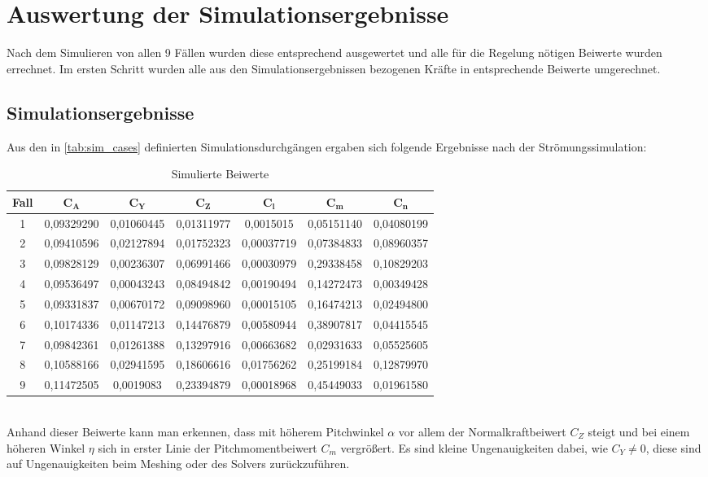 \section{Auswertung der Simulationsergebnisse}
\label{sec:simulation_results}
Nach dem Simulieren von allen 9 Fällen wurden diese entsprechend ausgewertet und alle für die Regelung nötigen Beiwerte wurden errechnet. Im ersten Schritt wurden alle aus den Simulationsergebnissen bezogenen Kräfte in entsprechende Beiwerte umgerechnet.
\newpage
\subsection{Simulationsergebnisse} 
\label{subsec:sim_results}
Aus den in \ref{tab:sim_cases} definierten Simulationsdurchgängen ergaben sich folgende Ergebnisse nach der Strömungssimulation:
\begin{table}[h]
\centering
\begin{tabular}{|c|c|c|c|c|c|c|}
\hline
\textbf{Fall} & $\mathbf{C_A}$ & $\mathbf{C_Y}$ & $\mathbf{C_Z}$ & $\mathbf{C_l}$ & $\mathbf{C_m}$ & $\mathbf{C_n}$ \\
\hline
1 & 0,09329290 & 0,01060445 & 0,01311977 & 0,0015015 & 0,05151140 & 0,04080199 \\
2 & 0,09410596 & 0,02127894 & 0,01752323 & 0,00037719 & 0,07384833 & 0,08960357 \\
3 & 0,09828129 & 0,00236307 & 0,06991466 & 0,00030979 & 0,29338458 & 0,10829203 \\
4 & 0,09536497 & 0,00043243 & 0,08494842 & 0,00190494 & 0,14272473 & 0,00349428 \\
5 & 0,09331837 & 0,00670172 & 0,09098960 & 0,00015105 & 0,16474213 & 0,02494800 \\
6 & 0,10174336 & 0,01147213 & 0,14476879 & 0,00580944 & 0,38907817 & 0,04415545 \\
7 & 0,09842361 & 0,01261388 & 0,13297916 & 0,00663682 & 0,02931633 & 0,05525605 \\
8 & 0,10588166 & 0,02941595 & 0,18606616 & 0,01756262 & 0,25199184 & 0,12879970 \\
9 & 0,11472505 & 0,0019083 & 0,23394879 & 0,00018968 & 0,45449033 & 0,01961580 \\
\hline
\end{tabular}
\caption{Simulierte Beiwerte}
\label{tab:sim_coefficients}
\end{table}
\\Anhand dieser Beiwerte kann man erkennen, dass mit höherem Pitchwinkel $\alpha$ vor allem der Normalkraftbeiwert $C_Z$ steigt und bei einem höheren Winkel $\eta$ sich in erster Linie der Pitchmomentbeiwert $C_m$ vergrößert. Es sind kleine Ungenauigkeiten dabei, wie $C_Y \neq 0$, diese sind auf Ungenauigkeiten beim Meshing oder des Solvers zurückzuführen.
